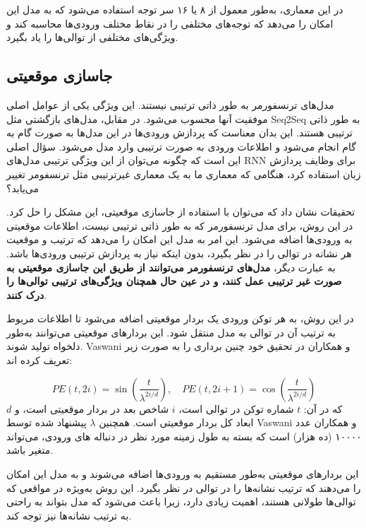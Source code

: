 در این معماری، به‌طور معمول از ۸ یا ۱۶ سر توجه استفاده می‌شود که به مدل این امکان را می‌دهد که توجه‌های مختلفی را در نقاط مختلف ورودی‌ها محاسبه کند و ویژگی‌های مختلفی از توالی‌ها را یاد بگیرد.

\subsection{جاسازی موقعیتی}

مدل‌های ترنسفورمر به طور ذاتی ترتیبی نیستند. این ویژگی یکی از عوامل اصلی موفقیت آنها محسوب می‌شود. در مقابل، مدل‌های بازگشتی مثل Seq2Seq به طور ذاتی ترتیبی هستند. این بدان معناست که پردازش ورودی‌ها در این مدل‌ها به صورت گام به گام انجام می‌شود و اطلاعات ورودی به صورت ترتیبی وارد مدل می‌شود. سؤال اصلی این است که چگونه می‌توان از این ویژگی ترتیبی مدل‌های RNN برای وظایف پردازش زبان استفاده کرد، هنگامی که معماری ما به یک معماری غیرترتیبی مثل ترنسفومر تغییر می‌یابد؟

تحقیقات نشان داد که می‌توان با استفاده از جاسازی موقعیتی، این مشکل را حل کرد. در این روش، برای مدل ترنسفورمر که به طور ذاتی ترتیبی نیست، اطلاعات موقعیتی به ورودی‌ها اضافه می‌شود. این امر به مدل این امکان را می‌دهد که ترتیب و موقعیت هر نشانه در توالی را در نظر بگیرد، بدون اینکه نیاز به پردازش ترتیبی ورودی‌ها باشد. به عبارت دیگر، \textbf{مدل‌های ترنسفورمر می‌توانند از طریق این جاسازی موقعیتی به صورت غیر ترتیبی عمل کنند، و در عین حال همچنان ویژگی‌های ترتیبی توالی‌ها را درک کنند}.

در این روش، به هر توکن ورودی یک بردار موقعیتی اضافه می‌شود تا اطلاعات مربوط به ترتیب آن در توالی به مدل منتقل شود. این بردارهای موقعیتی می‌توانند به‌طور دلخواه تولید شوند. Vaswani و همکاران در تحقیق خود چنین برداری را  به صورت زیر تعریف کرده اند:

\begin{equation}
PE(t, 2i) = \sin\left( \frac{t}{\lambda^{2i/d}} \right), \quad PE(t, 2i+1) = \cos\left( \frac{t}{\lambda^{2i/d}} \right)
\end{equation}
که در آن:
$t$ شماره توکن در توالی است،
$i$ شاخص بعد در بردار موقعیتی است،
و
$d$ ابعاد کل بردار موقعیتی است. 
همچنین $\lambda$ پیشنهاد شده توسط Vaswani و همکاران عدد ۱۰۰۰۰ (ده هزار) است که بسته به طول زمینه%
مورد نظر در دنباله های ورودی، می‌تواند متغیر باشد.

این بردارهای موقعیتی به‌طور مستقیم به ورودی‌ها اضافه می‌شوند و به مدل این امکان را می‌دهند که ترتیب نشانه‌ها را در توالی در نظر بگیرد. این روش به‌ویژه در مواقعی که توالی‌ها طولانی هستند، اهمیت زیادی دارد، زیرا باعث می‌شود که مدل بتواند به راحتی به ترتیب نشانه‌ها نیز توجه کند.

